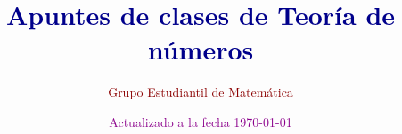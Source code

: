 \documentclass{gemnumber} %
\title{\Huge\bfseries\textcolor{DarkBlue}{Apuntes de clases de Teoría de números}}
\author{\LARGE\textcolor{DarkRed}{Grupo Estudiantil de Matemática}}
\date{\textcolor{DarkMagenta}{Actualizado a la fecha \today}}
\begin{document}
\maketitle



\newpage

\renewcommand{\contentsname}{Tabla de contenido}

\tableofcontents








\end{document}
